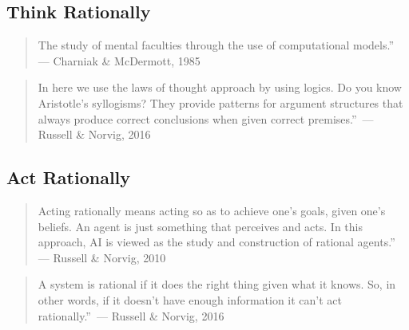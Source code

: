 \subsection*{Think Rationally}
\label{ssec:think-rational-def-ai}
\begin{quote}
The study of mental faculties through the use of computational models.''\\ \hspace*{\fill}--- Charniak \& McDermott, 1985 \end{quote} \begin{quote} In here we use the laws of thought approach by using logics. Do you know Aristotle’s syllogisms? They provide patterns for argument structures that always produce correct conclusions when given correct premises.''\
\hspace*{\fill}--- Russell & Norvig, 2016
\end{quote}

\subsection*{Act Rationally}
\label{ssec:act-rationl-def-ai}
\begin{quote}
Acting rationally means acting so as to achieve one's goals, given one's beliefs. An agent is just something that perceives and acts. In this approach, AI is viewed as the study and construction of rational agents.''\\ \hspace*{\fill}--- Russell \& Norvig, 2010 \end{quote} \begin{quote} A system is rational if it does the right thing given what it knows. So, in other words, if it doesn’t have enough information it can’t act rationally.''\
\hspace*{\fill}--- Russell & Norvig, 2016
\end{quote}
